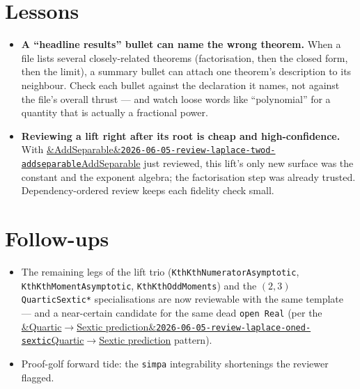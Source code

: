 \documentclass[11pt]{article}
\newcommand{\reviewref}[2][]{\href{https://therisensea.org/reviews/#2/}{\ifx&#1&\texttt{#2}\else#1\fi}}
\begin{document}
\section{Lessons}
\begin{itemize}[noitemsep]
  \item \textbf{A ``headline results'' bullet can name the wrong theorem.} When a file lists several
    closely-related theorems (factorisation, then the closed form, then the limit), a summary bullet
    can attach one theorem's description to its neighbour. Check each bullet against the declaration
    it names, not against the file's overall thrust --- and watch loose words like ``polynomial''
    for a quantity that is actually a fractional power.
  \item \textbf{Reviewing a lift right after its root is cheap and high-confidence.} With
    \reviewref[AddSeparable]{2026-06-05-review-laplace-twod-addseparable} just reviewed, this lift's
    only new surface was the constant and the exponent algebra; the factorisation step was already
    trusted. Dependency-ordered review keeps each fidelity check small.
\end{itemize}

\section{Follow-ups}
\begin{itemize}[noitemsep]
  \item The remaining legs of the lift trio (\texttt{KthKthNumeratorAsymptotic},
    \texttt{KthKthMomentAsymptotic}, \texttt{KthKthOddMoments}) and the $(2,3)$
    \texttt{QuarticSextic*} specialisations are now reviewable with the same template --- and a
    near-certain candidate for the same dead \texttt{open Real} (per the
    \reviewref[Quartic$\to$Sextic prediction]{2026-06-05-review-laplace-oned-sextic} pattern).
  \item Proof-golf forward tide: the \texttt{simpa} integrability shortenings the reviewer flagged.
\end{itemize}
\end{document}
